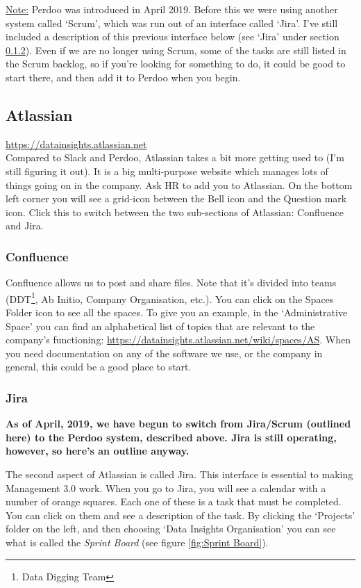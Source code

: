 \documentclass[11pt]{report}
\begin{document}
\underline{Note:} Perdoo was introduced in April 2019. Before this we were using another system called `Scrum', which was run out of an interface called `Jira'. I've still included a description of this previous interface below (see `Jira' under section \ref{Jira}). Even if we are no longer using Scrum, some of the tasks are still listed in the Scrum backlog, so if you're looking for something to do, it could be good to start there, and then add it to Perdoo when you begin.

\subsection{Atlassian}
\label{Atlassian}
\href{https://datainsights.atlassian.net}{https://datainsights.atlassian.net}\\

Compared to Slack and Perdoo, Atlassian takes a bit more getting used to (I'm still figuring it out). It is a big multi-purpose website which manages lots of things going on in the company. Ask HR to add you to Atlassian. On the bottom left corner you will see a grid-icon between the Bell icon and the Question mark icon. Click this to switch between the two sub-sections of Atlassian: Confluence and Jira.

\subsubsection{Confluence}
Confluence allows us to post and share files. Note that it's divided into teams (DDT\footnote{Data Digging Team}, Ab Initio, Company Organisation, etc.). You can click on the Spaces Folder icon to see all the spaces. To give you an example, in the `Administrative Space' you can find an alphabetical list of topics that are relevant to the company's functioning: \href{https://datainsights.atlassian.net/wiki/spaces/AS}{https://datainsights.atlassian.net/wiki/spaces/AS}. When you need documentation on any of the software we use, or the company in general, this could be a good place to start.

\subsubsection{Jira}
\label{Jira}
\textbf{As of April, 2019, we have begun to switch from Jira/Scrum (outlined here) to the Perdoo system, described above. Jira is still operating, however, so here's an outline anyway.}

The second aspect of Atlassian is called Jira. This interface is essential to making Management 3.0 work. When you go to Jira, you will see a calendar with a number of orange squares. Each one of these is a task that must be completed. You can click on them and see a description of the task. By clicking the `Projects' folder on the left, and then choosing `Data Insights Organisation' you can see what is called the \emph{Sprint Board} (see figure \ref{fig:Sprint Board}).
\end{document}
